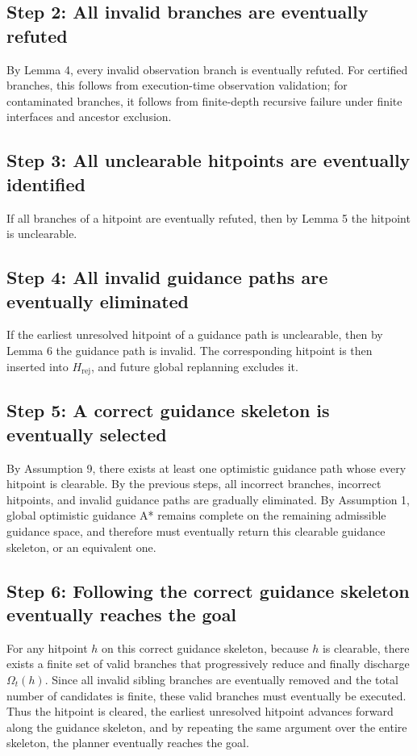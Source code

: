 \documentclass[11pt]{article}
\begin{document}
\subsection*{Step 2: All invalid branches are eventually refuted}

By Lemma 4, every invalid observation branch is eventually refuted. For certified branches, this follows from execution-time observation validation; for contaminated branches, it follows from finite-depth recursive failure under finite interfaces and ancestor exclusion.

\subsection*{Step 3: All unclearable hitpoints are eventually identified}

If all branches of a hitpoint are eventually refuted, then by Lemma 5 the hitpoint is unclearable.

\subsection*{Step 4: All invalid guidance paths are eventually eliminated}

If the earliest unresolved hitpoint of a guidance path is unclearable, then by Lemma 6 the guidance path is invalid. The corresponding hitpoint is then inserted into $H_{\mathrm{rej}}$, and future global replanning excludes it.

\subsection*{Step 5: A correct guidance skeleton is eventually selected}

By Assumption 9, there exists at least one optimistic guidance path whose every hitpoint is clearable. By the previous steps, all incorrect branches, incorrect hitpoints, and invalid guidance paths are gradually eliminated. By Assumption 1, global optimistic guidance A* remains complete on the remaining admissible guidance space, and therefore must eventually return this clearable guidance skeleton, or an equivalent one.

\subsection*{Step 6: Following the correct guidance skeleton eventually reaches the goal}

For any hitpoint $h$ on this correct guidance skeleton, because $h$ is clearable, there exists a finite set of valid branches that progressively reduce and finally discharge $\Omega_t(h)$. Since all invalid sibling branches are eventually removed and the total number of candidates is finite, these valid branches must eventually be executed. Thus the hitpoint is cleared, the earliest unresolved hitpoint advances forward along the guidance skeleton, and by repeating the same argument over the entire skeleton, the planner eventually reaches the goal.
\end{document}
